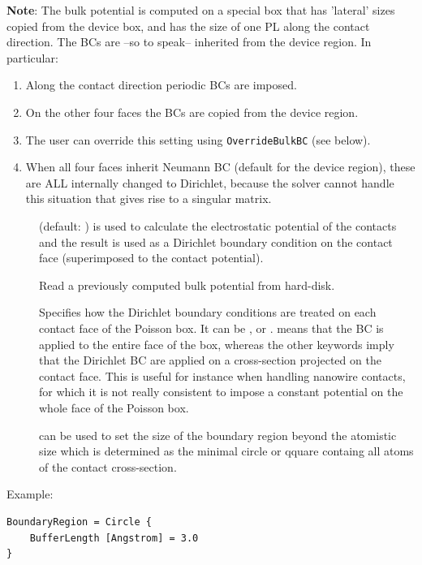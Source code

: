 {\bf Note}: The bulk potential is computed on a special box that has 'lateral'
sizes copied from the device box, and has the size of one PL along the contact
direction. The BCs are --so to speak-- inherited from the device region. In
particular:
\begin{enumerate}
\item Along the contact direction periodic BCs are imposed.
\item On the other four faces the BCs are copied from the device region.
\item The user can override this setting using \verb|OverrideBulkBC| (see
  below).
\item When all four faces inherit Neumann BC (default for the device region),
  these are ALL internally changed to Dirichlet, because the solver cannot
  handle this situation that gives rise to a singular matrix.
\end{enumerate}

\begin{description}
\item[] (default: ) is used to calculate the
  electrostatic potential of the contacts and the result is used as a Dirichlet
  boundary condition on the contact face (superimposed to the contact
  potential).
\item[] Read a previously computed bulk potential from
  hard-disk.
\item[] Specifies how the Dirichlet boundary conditions are
  treated on each contact face of the Poisson box. It can be ,
   or .  means that the BC is applied to the
  entire face of the box, whereas the other keywords imply that the Dirichlet
  BC are applied on a cross-section projected on the contact face. This is
  useful for instance when handling nanowire contacts, for which it is not
  really consistent to impose a constant potential on the whole face of the
  Poisson box.
\item[] can be used to set the size of
  the boundary region beyond the atomistic size which is determined as the
  minimal circle or qquare containg all atoms of the contact cross-section.
\end{description}

Example:
\begin{verbatim} 
BoundaryRegion = Circle {
    BufferLength [Angstrom] = 3.0 
}  
\end{verbatim}

